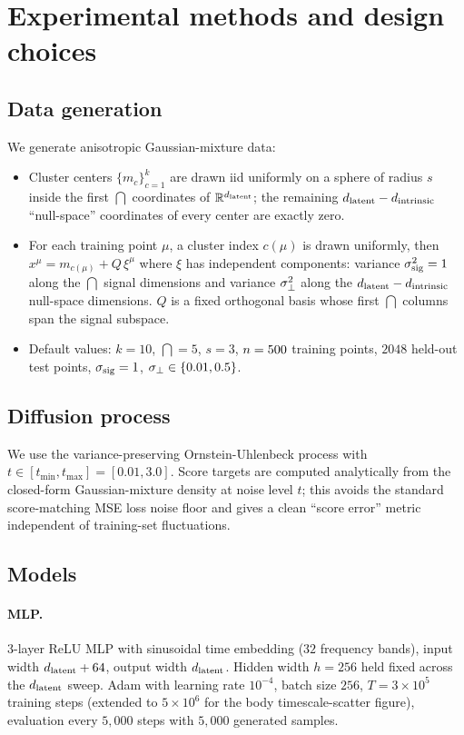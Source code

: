 \section{Experimental methods and design choices}
\label{app:methods}

\subsection{Data generation}
We generate anisotropic Gaussian-mixture data:
\begin{itemize}\itemsep1pt
\item Cluster centers $\{m_c\}_{c=1}^{k}$ are drawn iid uniformly on a sphere
      of radius $s$ inside the first $\dint$ coordinates of $\mathbb{R}^{d_{\mathrm{latent}}}$;
      the remaining $d_{\mathrm{latent}} - d_{\mathrm{intrinsic}}$ ``null-space'' coordinates of every
      center are exactly zero.
\item For each training point $\mu$, a cluster index $c(\mu)$ is drawn
      uniformly, then $x^{\mu} = m_{c(\mu)} + Q\,\xi^{\mu}$ where $\xi$
      has independent components: variance $\sigma_{\mathrm{sig}}^2 = 1$ along the
      $\dint$ signal dimensions and variance $\sigma_{\perp}^2$ along the
      $d_{\mathrm{latent}} - d_{\mathrm{intrinsic}}$ null-space dimensions. $Q$ is a fixed orthogonal
      basis whose first $\dint$ columns span the signal subspace.
\item Default values: $k = 10$, $\dint = 5$, $s = 3$,
      $n = 500$ training points, $2048$ held-out test points,
      $\sigma_{\mathrm{sig}} = 1$, $\sigma_{\perp} \in \{0.01, 0.5\}$.
\end{itemize}

\subsection{Diffusion process}
We use the variance-preserving Ornstein-Uhlenbeck process with
$t \in [t_{\min}, t_{\max}] = [0.01, 3.0]$. Score targets are computed
analytically from the closed-form Gaussian-mixture density at noise level $t$;
this avoids the standard score-matching MSE loss noise floor and gives a
clean ``score error'' metric independent of training-set fluctuations.

\subsection{Models}
\paragraph{MLP.} 3-layer ReLU MLP with sinusoidal time embedding ($32$
frequency bands), input width $d_{\mathrm{latent}} + 64$, output width $d_{\mathrm{latent}}$.
Hidden width $h = 256$ held fixed across the $d_{\mathrm{latent}}$ sweep. Adam with
learning rate $10^{-4}$, batch size $256$, $T = 3\times 10^5$ training
steps (extended to $5\times 10^6$ for the body timescale-scatter
figure), evaluation every $5{,}000$ steps with $5{,}000$ generated
samples.

